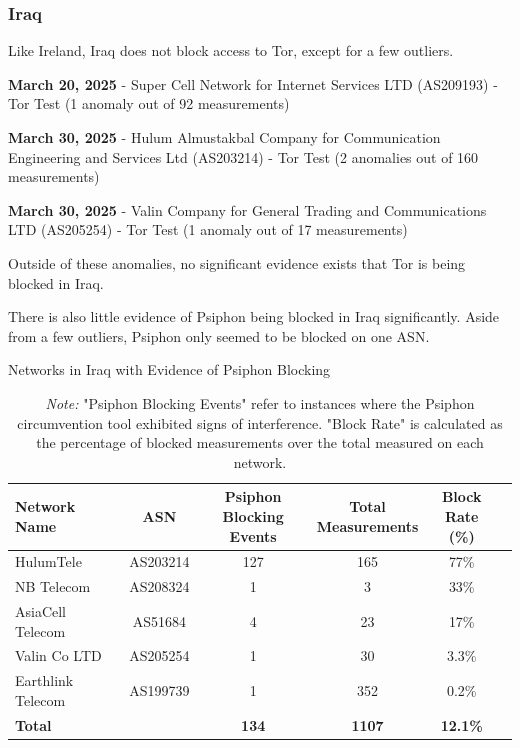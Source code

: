 \subsubsection{Iraq}

Like Ireland, Iraq does not block access to Tor, except for a few outliers.

\textbf{March 20, 2025} - Super Cell Network for Internet Services LTD (AS209193) - Tor Test (1 anomaly out of 92 measurements)

\textbf{March 30, 2025} - Hulum Almustakbal Company for Communication Engineering and Services Ltd (AS203214) - Tor Test (2 anomalies out of 160 measurements)

\textbf{March 30, 2025} - Valin Company for General Trading and Communications LTD (AS205254) - Tor Test (1 anomaly out of 17 measurements)

Outside of these anomalies, no significant evidence exists that Tor is being blocked in Iraq.

There is also little evidence of Psiphon being blocked in Iraq significantly. Aside from a few outliers, Psiphon only seemed to be blocked on one ASN. 

\vspace{2em}

\begin{table}[H]
\centering
\caption{Networks in Iraq with Evidence of Psiphon Blocking}
\begin{tabular}{lccccc}
\toprule
\textbf{Network Name} & \textbf{ASN} & \shortstack{\textbf{Psiphon} \\ \textbf{Blocking Events}} & \shortstack{\textbf{Total} \\ \textbf{Measurements}} & \shortstack{\textbf{Block} \\ \textbf{Rate (\%)}} \\
\midrule
HulumTele             & AS203214  & 127 & 165  & 77\%   \\
NB Telecom            & AS208324  & 1   & 3    & 33\%   \\
AsiaCell Telecom      & AS51684   & 4   & 23   & 17\%   \\
Valin Co LTD          & AS205254  & 1   & 30   & 3.3\%  \\
Earthlink Telecom     & AS199739  & 1   & 352  & 0.2\%  \\
\bottomrule
\textbf{Total}        &           & \textbf{134} & \textbf{1107} & \textbf{12.1\%} \\
\end{tabular}

\vspace{1em}

\caption*{\textit{Note:} "Psiphon Blocking Events" refer to instances where the Psiphon circumvention tool exhibited signs of interference. "Block Rate" is calculated as the percentage of blocked measurements over the total measured on each network.}
\label{tab:psiphon_block_iraq}
\end{table}

